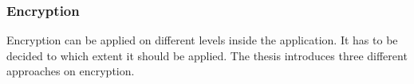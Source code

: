 \subsubsection{Encryption} \label{subsection:counter-replace-encryption-content-resource}
Encryption can be applied on different levels inside the application.
It has to be decided to which extent it should be applied.
The thesis introduces three different approaches on encryption.
